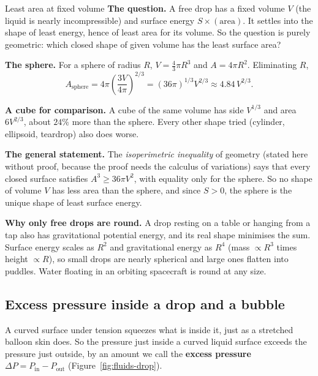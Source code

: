 \begin{derivbox}{Least area at fixed volume}
 \textbf{The question.} A free drop has a fixed volume $V$ (the liquid is nearly incompressible)
and surface energy $S\times(\text{area})$. It settles into the shape of least energy, hence of least area
for its volume. So the question is purely geometric: which closed shape of given volume has the least
surface area?

 \textbf{The sphere.} For a sphere of radius $R$, $V=\tfrac43\pi R^3$ and $A=4\pi R^2$. Eliminating
$R$,
\[
A_{\text{sphere}}=4\pi\left(\frac{3V}{4\pi}\right)^{2/3}=(36\pi)^{1/3}V^{2/3}\approx4.84\,V^{2/3}.
\]

 \textbf{A cube for comparison.} A cube of the same volume has side $V^{1/3}$ and area
$6V^{2/3}$, about $24\%$ more than the sphere. Every other shape tried (cylinder, ellipsoid, teardrop) also
does worse.

 \textbf{The general statement.} The \emph{isoperimetric inequality} of geometry (stated here
without proof, because the proof needs the calculus of variations) says that every closed surface satisfies
$A^3\ge36\pi V^2$, with equality only for the sphere. So no shape of volume $V$ has less area than the
sphere, and since $S>0$, the sphere is the unique shape of least surface energy.

 \textbf{Why only free drops are round.} A drop resting on a table or hanging from a tap also has
gravitational potential energy, and its real shape minimises the sum. Surface energy scales as $R^2$ and
gravitational energy as $R^4$ (mass $\propto R^3$ times height $\propto R$), so small drops are nearly
spherical and large ones flatten into puddles. Water floating in an orbiting spacecraft is round at any
size.
\end{derivbox}

\subsection{Excess pressure inside a drop and a bubble}

A curved surface under tension squeezes what is inside it, just as a stretched balloon skin does. So the
pressure just inside a curved liquid surface exceeds the pressure just outside, by an amount we call the
\textbf{excess pressure} $\Delta P=P_{\text{in}}-P_{\text{out}}$ (Figure~\ref{fig:fluids-drop}).

\begin{figure}[htbp]
\centering
{}
\end{figure}

